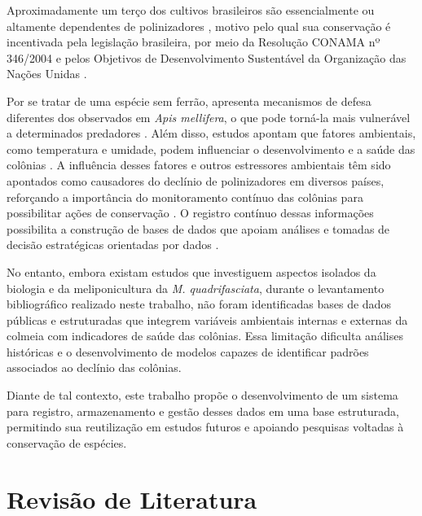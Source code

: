 \documentclass[12pt]{unisenaiclass}
\begin{document}
Aproximadamente um terço dos cultivos brasileiros são essencialmente ou altamente dependentes de polinizadores \cite{giannini2015dependence}, motivo pelo qual sua conservação é incentivada pela legislação brasileira, por meio da Resolução CONAMA nº 346/2004 \cite{brasil2004conama346} e pelos Objetivos de Desenvolvimento Sustentável da Organização das Nações Unidas \cite{onu2015agenda2030}.

Por se tratar de uma espécie sem ferrão, apresenta mecanismos de defesa diferentes dos observados em \textit{Apis mellifera}, o que pode torná-la mais vulnerável a determinados predadores \cite{roubik2023}. Além disso, estudos apontam que fatores ambientais, como temperatura e umidade, podem influenciar o desenvolvimento e a saúde das colônias \cite{maiasilva2014}. A influência desses fatores e outros estressores ambientais têm sido apontados como causadores do declínio de polinizadores em diversos países, reforçando a importância do monitoramento contínuo das colônias para possibilitar ações de conservação \cite{potts2010global}. O registro contínuo dessas informações possibilita a construção de bases de dados que apoiam análises e tomadas de decisão estratégicas orientadas por dados \cite{provost2013data}.

No entanto, embora existam estudos que investiguem aspectos isolados da biologia e da meliponicultura da \textit{M. quadrifasciata}, durante o levantamento bibliográfico realizado neste trabalho, não foram identificadas bases de dados públicas e estruturadas que integrem variáveis ambientais internas e externas da colmeia com indicadores de saúde das colônias. Essa limitação dificulta análises históricas e o desenvolvimento de modelos capazes de identificar padrões associados ao declínio das colônias. 

Diante de tal contexto, este trabalho propõe o desenvolvimento de um sistema para registro, armazenamento e gestão desses dados em uma base estruturada, permitindo sua reutilização em estudos futuros e apoiando pesquisas voltadas à conservação de espécies.

\section{Revisão de Literatura}
\end{document}
